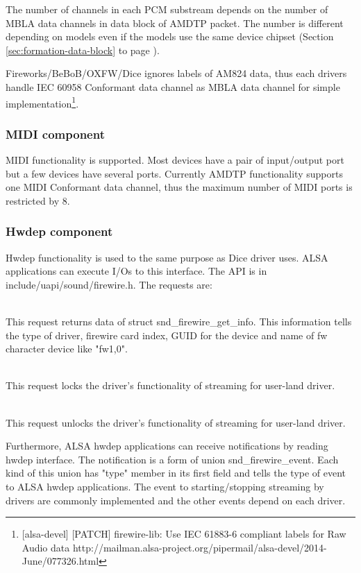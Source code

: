 \documentclass[onecolumn]{article}
\begin{document}
The number of channels in each PCM substream depends on the number of MBLA data channels in data block of AMDTP packet. The number is different depending on models even if the models use the same device chipset (Section \ref{sec:formation-data-block} to page \pageref{sec:formation-data-block}).

Fireworks/BeBoB/OXFW/Dice ignores labels of AM824 data, thus each drivers handle IEC 60958 Conformant data channel as MBLA data channel for simple implementation\footnote{[alsa-devel] [PATCH] firewire-lib: Use IEC 61883-6 compliant labels for Raw Audio data http://mailman.alsa-project.org/pipermail/alsa-devel/2014-June/077326.html}.

\subsubsection{MIDI component}

MIDI functionality is supported. Most devices have a pair of input/output port but a few devices have several ports. Currently AMDTP functionality supports one MIDI Conformant data channel, thus the maximum number of MIDI ports is restricted by 8.

\subsubsection{Hwdep component}
Hwdep functionality is used to the same purpose as Dice driver uses. ALSA applications can execute I/Os to this interface. The API is in include/uapi/sound/firewire.h. The requests are:

\begin{description}
\small
\item [SNDRV\_FIREWIRE\_IOCTL\_GET\_INFO] \mbox{} \\
This request returns data of struct snd\_firewire\_get\_info. This information tells the type of driver, firewire card index, GUID for the device and name of fw character device like "fw1,0".
\item [SNDRV\_FIREWIRE\_IOCTL\_LOCK] \mbox{} \\
This request locks the driver's functionality of streaming for user-land driver.
\item [SNDRV\_FIREWIRE\_IOCTL\_UNLOCK] \mbox{} \\
This request unlocks the driver's functionality of streaming for user-land driver.
\end{description}

Furthermore, ALSA hwdep applications can receive notifications by reading hwdep interface. The notification is a form of union snd\_firewire\_event. Each kind of this union has "type" member in its first field and tells the type of event to ALSA hwdep applications. The event to starting/stopping streaming by drivers are commonly implemented and the other events depend on each driver.
\end{document}
